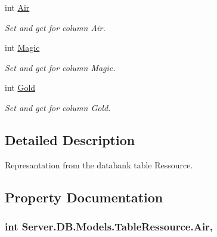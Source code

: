 \begin{DoxyCompactItemize}
int \hyperlink{classServer_1_1DB_1_1Models_1_1TableRessource_a109290def65a576ea7cfe696679657cf}{Air}
\begin{DoxyCompactList}\small\item\em Set and get for column Air. \end{DoxyCompactList}\item 
int \hyperlink{classServer_1_1DB_1_1Models_1_1TableRessource_a2ec5a4252645f866d424376c1810f4fa}{Magic}
\begin{DoxyCompactList}\small\item\em Set and get for column Magic. \end{DoxyCompactList}\item 
int \hyperlink{classServer_1_1DB_1_1Models_1_1TableRessource_af42f1f7c1df894cd54bc5965422c5310}{Gold}
\begin{DoxyCompactList}\small\item\em Set and get for column Gold. \end{DoxyCompactList}\end{DoxyCompactItemize}


\subsection{Detailed Description}
Represantation from the databank table Ressource. 



\subsection{Property Documentation}
\hypertarget{classServer_1_1DB_1_1Models_1_1TableRessource_a109290def65a576ea7cfe696679657cf}{
\subsubsection[{Air}]{\setlength{\rightskip}{0pt plus 5cm}int Server.\-D\-B.\-Models.\-Table\-Ressource.\-Air\hspace{0.3cm}{\ttfamily [get]}, {\ttfamily [set]}}}\label{classServer_1_1DB_1_1Models_1_1TableRessource_a109290def65a576ea7cfe696679657cf}


